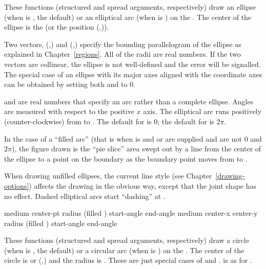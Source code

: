 These functions (structured and spread arguments, respectively) draw an ellipse
(when  is , the default) or an elliptical arc (when
 is ) on the  .  The center of
the ellipse is the   (or the position
(,)).

Two vectors, (,) and
(,) specify the bounding parallelogram of the
ellipse as explained in Chapter~\ref{regions}.  All of the radii are real
numbers.  If the two vectors are collinear, the ellipse is not well-defined and
the  error will be signalled.  The special case
of an ellipse with its major axes aligned with the coordinate axes can be
obtained by setting both  and  to 0.

 and  are real numbers that specify an arc
rather than a complete ellipse.  Angles are measured with respect to the
positive $x$ axis.  The elliptical arc runs positively (counter-clockwise) from
 to .  The default for  is $0$;
the default for  is $2\pi$.

In the case of a ``filled arc'' (that is when  is  and
 or  are supplied and are not $0$ and $2\pi$),
the figure drawn is the ``pie slice'' area swept out by a line from the center
of the ellipse to a point on the boundary as the boundary point moves from
 to .

When drawing unfilled ellipses, the current line style (see
Chapter~\ref{drawing-options}) affects the drawing in the obvious way, except
that the joint shape has no effect.  Dashed elliptical arcs start ``dashing'' at
.


  {medium center-pt radius \key (filled ) start-angle end-angle
                       \DrawingOptions \LineCapOptions}
 {medium center-x center-y radius \key (filled ) start-angle end-angle
                       \DrawingOptions \LineCapOptions}

These functions (structured and spread arguments, respectively) draw a circle
(when  is , the default) or a circular arc (when
 is ) on the  .  The center of
the circle is  or (,) and the radius
is .  These are just special cases of  and
.   is as for .

